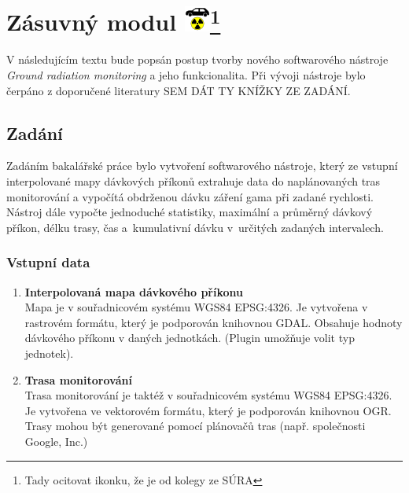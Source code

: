 \chapter[Zásuvný modul]{Zásuvný modul \includegraphics[scale=0.65]{./pictures/ikonka.png}\footnote{Tady ocitovat ikonku, že je od kolegy ze SÚRA}}
\label{4-plugin}

V následujícím textu bude popsán postup tvorby nového softwarového nástroje \textit{Ground radiation monitoring} a jeho funkcionalita. Při vývoji nástroje bylo čerpáno z doporučené literatury SEM DÁT TY KNÍŽKY ZE ZADÁNÍ. 

\section{Zadání}
Zadáním bakalářské práce bylo vytvoření softwarového nástroje, který ze vstupní interpolované mapy dávkových příkonů extrahuje data do naplánovaných tras monitorování a vypočítá obdrženou dávku záření gama při zadané rychlosti. Nástroj dále vypočte jednoduché statistiky, maximální a průměrný dávkový příkon, délku trasy, čas a~kumulativní dávku v~určitých zadaných intervalech.

\subsection{Vstupní data}
\begin{enumerate}
	\item \textbf{Interpolovaná mapa dávkového příkonu} \\
	Mapa je v souřadnicovém systému WGS84 EPSG:4326. Je vytvořena v rastrovém formátu, který je podporován knihovnou GDAL. Obsahuje hodnoty dávkového příkonu v daných jednotkách. (Plugin umožňuje volit typ jednotek). 
	\item \textbf{Trasa monitorování} \\
	Trasa monitorování je taktéž v souřadnicovém systému WGS84 EPSG:4326. Je vytvořena ve vektorovém formátu, který je podporován knihovnou OGR. Trasy mohou být generované pomocí plánovačů tras (např. společnosti Google, Inc.) 
\end{enumerate}

